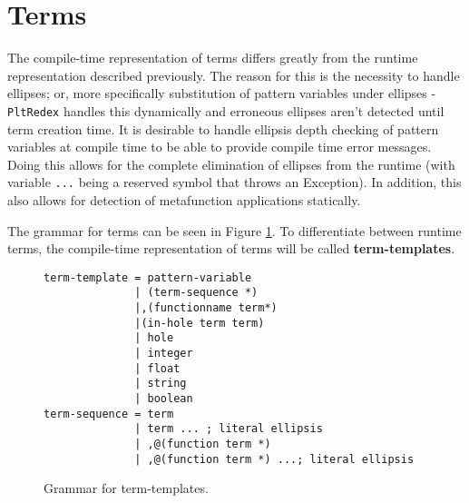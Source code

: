 \section{Terms}

The compile-time representation of terms differs greatly from the runtime representation described previously. The reason for this is the necessity to handle ellipses; or, more specifically substitution of pattern variables under ellipses - \texttt{PltRedex} handles this dynamically and erroneous ellipses aren't detected until term creation time.
It is desirable to handle ellipsis depth checking of pattern variables at compile time to be able to provide compile time error messages. Doing this allows for the complete elimination of ellipses from the runtime (with variable \texttt{...} being a reserved symbol that throws an Exception). In addition, this also allows for detection of metafunction applications statically.

The grammar for terms can be seen in Figure \ref{termtemplate-grammar}. To differentiate between runtime terms, the compile-time representation of terms will be called \textbf{term-templates}.

\begin{figure}
\begin{verbatim}
term-template = pattern-variable 
              | (term-sequence *)
              |,(functionname term*) 
              |(in-hole term term)
              | hole
              | integer
              | float
              | string
              | boolean 
term-sequence = term
              | term ... ; literal ellipsis
              | ,@(function term *)
              | ,@(function term *) ...; literal ellipsis 
\end{verbatim}
\caption{Grammar for term-templates.}
\label{termtemplate-grammar}
\end{figure}

